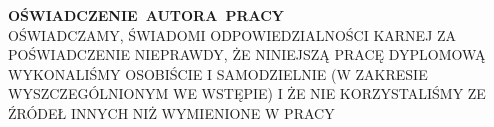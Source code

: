 \begin{titlepage}
\begin{flushright}
\begin{minipage}[!h]{13cm}
\mbox{\large{\scshape \textbf{OŚWIADCZENIE AUTORA PRACY}}}\\[3mm] 
{\scshape OŚWIADCZAMY, ŚWIADOMI ODPOWIEDZIALNOŚCI KARNEJ ZA POŚWIADCZENIE NIEPRAWDY, ŻE NINIEJSZĄ PRACĘ DYPLOMOWĄ WYKONALIŚMY OSOBIŚCIE
 I SAMODZIELNIE (W ZAKRESIE WYSZCZEGÓLNIONYM WE WSTĘPIE) I ŻE NIE KORZYSTALIŚMY ZE ŹRÓDEŁ INNYCH NIŻ WYMIENIONE W PRACY}\\
\end{minipage}

\vspace{2cm}

\makebox[6cm][s]{\dotfill}\par
{}

\end{flushright}
\end{titlepage}
